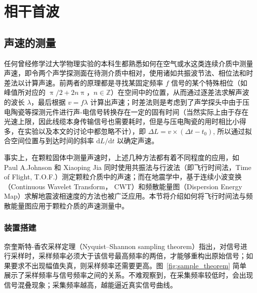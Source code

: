 
\chapter{相干首波}

\section{声速的测量}

任何曾经修学过大学物理实验的本科生都熟悉如何在空气或水这类连续介质中测量声速，即令两个声学探测面在待测介质中相对，使用诸如共振波节法、相位法和时差法以计算声速。前两者的原理都是寻找某固定频率 $f$ 信号的某个特殊相位（如峰值所对应的 $\uppi/2 + 2n\uppi$，$n\in\mathbb{Z}$）在空间中的位置，从而通过逐差法求解声波的波长 $\lambda$，最后根据 $v=f\lambda$ 计算出声速；时差法则是考虑到了声学探头中由于压电陶瓷等探测元件进行声-电信号转换存在一定的固有时间（当然实际上由于存在光速上限，因此线缆本身传输信号也需要耗时，但是与压电陶瓷的用时相比小得多，在实验以及本文的讨论中都忽略不计），即 $\Delta L = v\times(\Delta t - t_{0})$, 所以通过拟合空间位置与到达时间的斜率 $\mathrm{d}L/\mathrm{d}t$ 以确定声速。

事实上，在颗粒固体中测量声速时，上述几种方法都有着不同程度的应用，如 Paul A.Johnson 和 Xiaoping Jia 同时使用共振法与行波法（即飞行时间法，Time of Flight, T.O.F.）测定颗粒介质中的声速\cite{Johnson_2005}；而在地震学中，基于连续小波变换\cite{9356107}（Continuous Wavelet Transform， CWT）和频散能量图（Dispersion Energy Map）求解地震波相速度的方法也被广泛应用。本节将介绍如何将飞行时间法与频散能量图应用于颗粒介质的声速测量中。

\subsection{装置搭建}

奈奎斯特-香农采样定理（Nyquist–Shannon sampling theorem）指出，对信号进行采样时，采样频率必须大于该信号最高频率的两倍，才能够重构出原始信号；如果要求不出现幅值失真，则采样频率还需要更高。图~\ref{fig:sample_theorem} 简单展示了采样频率与信号频率之间的关系。不难观察到，在采集频率较低时，会出现信号混叠现象；采集频率越高，越能逼近真实信号曲线。

